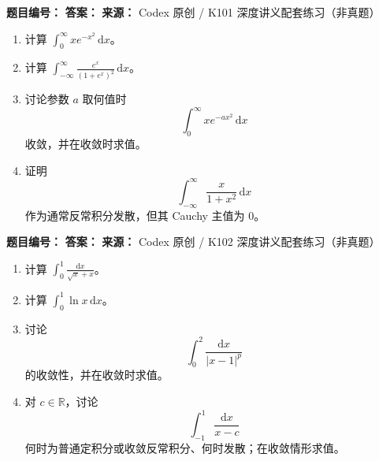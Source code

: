\begin{problemBox}
\begin{problemMeta}
\textbf{题目编号：} \quad
\textbf{答案：} \quad
\textbf{来源：} Codex 原创 / K101 深度讲义配套练习（非真题）
\end{problemMeta}
\begin{enumerate}
  \item[\textbf{A}] 计算
  \(\displaystyle\int_0^\infty xe^{-x^2}\,\mathrm dx\)。
  \item[\textbf{B}] 计算
  \(\displaystyle\int_{-\infty}^{\infty}
  \frac{e^x}{(1+e^x)^2}\,\mathrm dx\)。
  \item[\textbf{C}] 讨论参数 \(a\) 取何值时
  \[
  \int_0^\infty xe^{-ax^2}\,\mathrm dx
  \]
  收敛，并在收敛时求值。
  \item[\textbf{M}] 证明
  \[
  \int_{-\infty}^{\infty}\frac{x}{1+x^2}\,\mathrm dx
  \]
  作为通常反常积分发散，但其 Cauchy 主值为 \(0\)。
\end{enumerate}
\end{problemBox}

\begin{problemBox}
\begin{problemMeta}
\textbf{题目编号：} \quad
\textbf{答案：} \quad
\textbf{来源：} Codex 原创 / K102 深度讲义配套练习（非真题）
\end{problemMeta}
\begin{enumerate}
  \item[\textbf{A}] 计算
  \(\displaystyle\int_0^1\frac{\mathrm dx}{\sqrt x+x}\)。
  \item[\textbf{B}] 计算
  \(\displaystyle\int_0^1\ln x\,\mathrm dx\)。
  \item[\textbf{C}] 讨论
  \[
  \int_0^2\frac{\mathrm dx}{|x-1|^p}
  \]
  的收敛性，并在收敛时求值。
  \item[\textbf{M}] 对 \(c\in\mathbb R\)，讨论
  \[
  \int_{-1}^{1}\frac{\mathrm dx}{x-c}
  \]
  何时为普通定积分或收敛反常积分、何时发散；在收敛情形求值。
\end{enumerate}
\end{problemBox}

